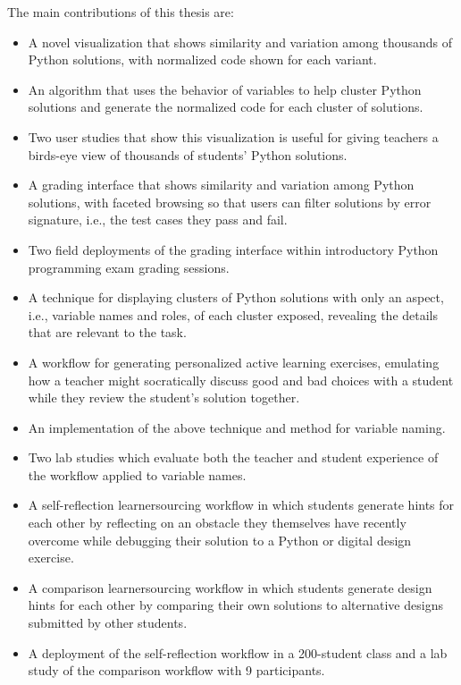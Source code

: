 The main contributions of this thesis are:
\begin{itemize}
\item A novel visualization that shows similarity and variation among thousands of Python solutions, with normalized code shown for each variant. 
\item An algorithm that uses the behavior of variables to help cluster Python solutions and generate the normalized code for each cluster of solutions.
\item Two user studies that show this visualization is useful for giving teachers a birds-eye view of thousands of students' Python solutions.
\item A grading interface that shows similarity and variation among Python solutions, with faceted browsing so that users can filter solutions by error signature, i.e., the test cases they pass and fail. 
\item Two field deployments of the grading interface within introductory Python programming exam grading sessions.
\item A technique for displaying clusters of Python solutions with only an aspect, i.e., variable names and roles, of each cluster exposed, revealing the details that are relevant to the task. %
\item A workflow for generating personalized active learning exercises, emulating how a teacher might socratically discuss good and bad choices with a student while they review the student's solution together. 
\item An implementation of the above technique and method for variable naming. %
\item Two lab studies which evaluate both the teacher and student experience of the workflow applied to variable names.
\item A self-reflection learnersourcing workflow in which students generate hints for each other by reflecting on an obstacle they themselves have recently overcome while debugging their solution to a Python or digital design exercise.
\item A comparison learnersourcing workflow in which students generate design hints for each other by comparing their own solutions to alternative designs submitted by other students.
\item A deployment of the self-reflection workflow in a 200-student class and a lab study of the comparison workflow with 9 participants.
\end{itemize}

